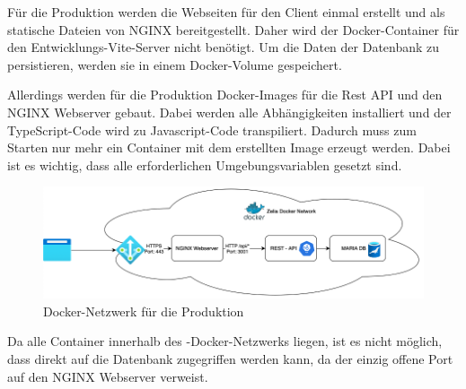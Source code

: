 
Für die Produktion werden die Webseiten für den Client einmal erstellt und als statische Dateien von NGINX bereitgestellt. 
Daher wird der Docker-Container für den Entwicklungs-Vite-Server nicht benötigt. 
Um die Daten der Datenbank zu persistieren, werden sie in einem Docker-Volume gespeichert. 

Allerdings werden für die Produktion Docker-Images für die Rest API und den NGINX Webserver gebaut. Dabei werden alle Abhängigkeiten installiert und der TypeScript-Code wird zu Javascript-Code transpiliert. Dadurch muss zum Starten nur mehr ein Container mit dem erstellten Image erzeugt werden. 
Dabei ist es wichtig, dass alle erforderlichen Umgebungsvariablen gesetzt sind.

\begin{figure}[H]
    \centering
    \includegraphics{media/Docker/ProdNetwork.png}
    \caption{Docker-Netzwerk für die Produktion}
\end{figure}

Da alle Container innerhalb des \ZELIA-Docker-Netzwerks liegen, ist es nicht möglich, dass direkt auf die Datenbank zugegriffen werden kann, da der einzig offene Port auf den NGINX Webserver verweist. 


